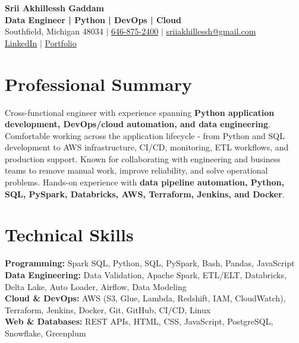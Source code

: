 \documentclass[letterpaper,10pt]{article}
\begin{document}
\fontsize{9.35pt}{10.45pt}\selectfont

\begin{center}
    {\LARGE \textbf{Srii Akhillessh Gaddam}} \\[-1pt]
    \textbf{Data Engineer | Python | DevOps | Cloud} \\[2pt]
    Southfield, Michigan 48034 $|$
    \href{tel:6468752400}{646-875-2400} $|$
    \href{mailto:sriiakhillessh@gmail.com}{sriiakhillessh@gmail.com} \\[1pt]
    \href{https://www.linkedin.com/in/srii-akhiilessh-gaddam-b48668191/}{LinkedIn} $|$
    \href{https://sriiakhillesshg.github.io/portfolio/}{Portfolio}
\end{center}
\vspace{-8pt}

\section{Professional Summary}
\small{Cross-functional engineer with experience spanning \textbf{Python application development, DevOps/cloud automation, and data engineering}. Comfortable working across the application lifecycle - from Python and SQL development to AWS infrastructure, CI/CD, monitoring, ETL workflows, and production support. Known for collaborating with engineering and business teams to remove manual work, improve reliability, and solve operational problems. Hands-on experience with \textbf{data pipeline automation, Python, SQL, PySpark, Databricks, AWS, Terraform, Jenkins, and Docker}.}

\section{Technical Skills}
\small{
\textbf{Programming:} Spark SQL, Python, SQL, PySpark, Bash, Pandas, JavaScript \\
\textbf{Data Engineering:} Data Validation, Apache Spark, ETL/ELT, Databricks, Delta Lake, Auto Loader, Airflow, Data Modeling \\
\textbf{Cloud \& DevOps:} AWS (S3, Glue, Lambda, Redshift, IAM, CloudWatch), Terraform, Jenkins, Docker, Git, GitHub, CI/CD, Linux \\
\textbf{Web \& Databases:} REST APIs, HTML, CSS, JavaScript, PostgreSQL, Snowflake, Greenplum
}

\end{document}
